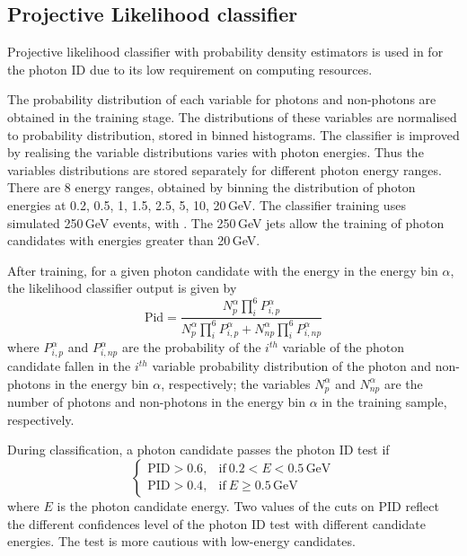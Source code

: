 
\subsection{Projective Likelihood classifier}


Projective likelihood classifier  with probability density estimators is used in \pandora for the photon ID due to its  low requirement on computing resources.

The probability distribution of each variable for photons and non-photons are obtained in the training stage. The distributions of these variables are normalised to probability distribution, stored in binned histograms. The classifier is improved by realising the variable distributions varies with photon energies. Thus the variables distributions are stored separately for different photon energy ranges. There are 8 energy ranges, obtained by binning the distribution of photon energies at 0.2, 0.5, 1, 1.5, 2.5, 5, 10, 20\,GeV. The classifier training uses simulated 250\,GeV \Zprime events, with \Zuds. The 250\,GeV jets allow the training of photon candidates with energies greater than 20\,GeV.


After training, for a given photon candidate with the energy in the energy bin $\alpha$, the likelihood classifier output is given by
\begin{equation}
\text{Pid} = \frac{N_p^\alpha \prod_{i}^6{P_{i,p}^\alpha}}{N_p^\alpha\prod_{i}^6{P_{i,p}^\alpha} + N_{np}^\alpha\prod_{i}^6{P_{i,np}^\alpha}}
\end{equation}
where $P^\alpha_{i,p}$ and $P^\alpha_{i,np}$ are the probability of the   $i^{th}$ variable  of the photon candidate fallen in the  $i^{th}$ variable probability distribution of the photon and non-photons in the energy bin $\alpha$, respectively; the variables $N^\alpha_{p}$ and $N^\alpha_{np}$ are the number of photons and non-photons in the energy bin $\alpha$ in the training sample, respectively.


During classification, a photon candidate passes the photon ID test if
\begin{equation}
\begin{cases}
  \text{PID} > 0.6, & \text{if}\ 0.2 < E < 0.5\,\text{GeV}\\
  \text{PID} > 0.4, & \text{if}\ E \geqslant 0.5\,\text{GeV}
\end{cases}
\end{equation}
where $E$ is the photon candidate energy. Two values of the cuts on $\text{PID}$ reflect the different confidences level of the photon ID test with different candidate energies. The test is more cautious with low-energy candidates.


